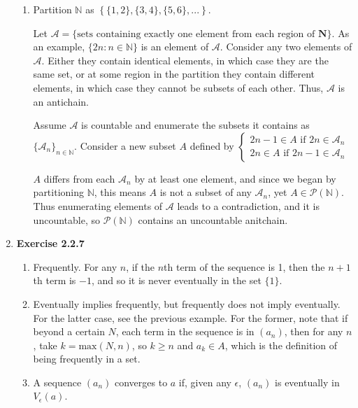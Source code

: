 \documentclass{article}
\begin{document}
\begin{enumerate}
\begin{enumerate}
            \item Partition $\mathbb{N}$ as $\left\{\{1, 2\}, \{3, 4\}, \{5, 6\}, ... \right\}$. 
            
            Let $\mathcal{A} = \{ \text{sets containing exactly one element from each region of } \mathbf{N}\}$. As an example, $\{2n: n \in \mathbb{N}\}$ is an element of $\mathcal{A}$. Consider any two elements of $\mathcal{A}$. Either they contain identical elements, in which case they are the same set, or at some region in the partition they contain different elements, in which case they cannot be subsets of each other. Thus, $\mathcal{A}$ is an antichain. 
            

            Assume $\mathcal{A}$ is countable and enumerate the subsets it contains as $\{\mathcal{A}_n\}_{n \in \mathbb{N}}$. Consider a new subset $A$ defined by $\begin{cases}
                2n - 1\in A \text{ if } 2n \in \mathcal{A}_n \\
                2n \in A \text{ if } 2n -1 \in \mathcal{A}_n
            \end{cases}$

            $A$ differs from each $\mathcal{A}_n$ by at least one element, and since we began by partitioning $\mathbb{N}$, this means $A$ is not a subset of any $\mathcal{A}_n$, yet $A \in \mathcal{P}(\mathbb{N})$. Thus enumerating elements of $\mathcal{A}$ leads to a contradiction, and it is uncountable, so $\mathcal{P}(\mathbb{N})$ contains an uncountable anitchain. 
        \end{enumerate}

    \item \textbf{Exercise 2.2.7}
        \begin{enumerate}
            \item Frequently. For any $n$, if the $n$th term of the sequence is 1, then the $n+1$th term is $-1$, and so it is never eventually in the set $\{1\}$.

            \item Eventually implies frequently, but frequently does not imply eventually. For the latter case, see the previous example. For the former, note that if beyond a certain $N$, each term in the sequence is in $(a_n)$, then for any $n$, take $k = \text{max}(N, n)$, so $k \geq n$ and $a_k \in A$, which is the definition of being frequently in a set. 

            \item A sequence $(a_n)$ converges to $a$ if, given any $\epsilon$, $(a_n)$ is eventually in $V_\epsilon(a)$.


\end{enumerate}
\end{enumerate}
\end{document}
